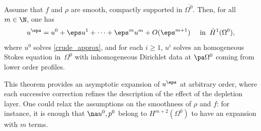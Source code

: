 \begin{thm} \label{thm2}
Assume that $f$ and $\rho$ are smooth, compactly supported in $\overline{\Omega^0}$. Then, for all $m \in \N$, one has
\[
u^\eps = u^0 + \eps u^1 + \dots + \eps^m u^m + O(\eps^{m+1}) \quad \text{ in } \: \dot{H}^1(\Omega^0),
\]
where $u^0$ solves \eqref{crude_approx}, and for each $i \ge 1$, $u^i$ solves an homogeneous Stokes equation in~$\Omega^0$ with inhomogeneous Dirichlet data at $\pa \Omega^0$ coming from lower order profiles.
\end{thm}
This theorem provides an asymptotic expansion of $u^\eps$ at arbitrary order, where each successive correction refines the description of the effect of the depletion layer. One could relax the assumptions on the smoothness of $\rho$ and $f$: for instance, it is enough that $\na u^0,p^0$ belong to $H^{m+2}(\Omega^0)$ to have an expansion with $m$ terms.
